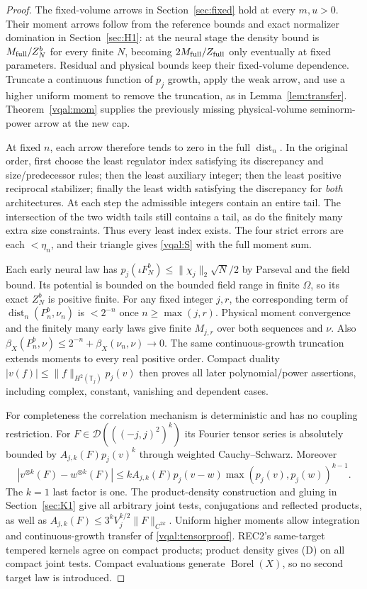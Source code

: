 \documentclass[11pt]{article}
\theoremstyle{plain}
\theoremstyle{definition}
\theoremstyle{remark}
\newcommand{\T}{\mathbb{T}}
\newcommand{\cD}{\mathcal{D}}
\begin{document}
\begin{proof}
The fixed-volume arrows in Section~\ref{sec:fixed} hold at every
$m,u>0$. Their moment arrows follow from the reference bounds and exact
normalizer domination in Section~\ref{sec:H1}: at the neural stage the
density bound is $M_{\rm full}/Z_N^b$ for every finite $N$, becoming
$2M_{\rm full}/Z_{\rm full}$ only eventually at fixed parameters.
Residual and physical bounds keep their fixed-volume dependence.
Truncate a continuous function of $p_j$ growth, apply the weak arrow,
and use a higher uniform moment to remove the truncation, as in
Lemma~\ref{lem:transfer}. Theorem~\ref{vqal:mom} supplies the previously
missing physical-volume seminorm-power arrow at the new cap.

At fixed $n$, each arrow therefore tends to zero in the full
$\operatorname{dist}_n$. In the original order, first choose the least
regulator index satisfying its discrepancy and size/predecessor rules;
then the least auxiliary integer; then the least positive reciprocal
stabilizer; finally the least width satisfying the discrepancy for
\emph{both} architectures. At each step the admissible integers contain
an entire tail. The intersection of the two width tails still contains
a tail, as do the finitely many extra size constraints. Thus every
least index exists. The four strict errors are each $<\eta_n$, and
their triangle gives \eqref{vqal:S} with the full moment sum.

Each early neural law has
$p_j(\iota F_N^b)\le\|\chi_j\|_2\sqrt N/2$ by Parseval and the
field bound. Its potential is bounded on the bounded field range in
finite $\Omega$, so its exact $Z_N^b$ is positive finite. For any fixed
integer $j,r$, the corresponding term of
$\operatorname{dist}_n(P_n^b,\nu_n)$ is $<2^{-n}$ once
$n\ge\max(j,r)$. Physical moment convergence and the finitely many
early laws give finite $M_{j,r}$ over both sequences and $\nu$.
Also $\beta_X(P_n^b,\nu)\le2^{-n}+\beta_X(\nu_n,\nu)\to0$.
The same continuous-growth truncation extends moments to every real
positive order. Compact duality $|v(f)|\le\|f\|_{H^2(\T_j)}p_j(v)$
then proves all later polynomial/power assertions, including complex,
constant, vanishing and dependent cases.

For completeness the correlation mechanism is deterministic and has no
coupling restriction. For $F\in\cD(((-j,j)^2)^k)$ its Fourier tensor
series is absolutely bounded by $A_{j,k}(F)p_j(v)^k$ through weighted
Cauchy--Schwarz. Moreover
\begin{equation}\label{vqal:tensorproof}
 |v^{\otimes k}(F)-w^{\otimes k}(F)|
 \le kA_{j,k}(F)p_j(v-w)\max(p_j(v),p_j(w))^{k-1}.
\end{equation}
The $k=1$ last factor is one. The product-density construction and
gluing in Section~\ref{sec:K1} give all arbitrary joint tests,
conjugations and reflected products, as well as
$A_{j,k}(F)\le3^kV_j^{k/2}\|F\|_{C^{2k}}$.
Uniform higher moments allow integration and continuous-growth transfer
of \eqref{vqal:tensorproof}. REC2's same-target tempered kernels agree
on compact products; product density gives (D) on all compact joint
tests. Compact evaluations generate $\operatorname{Borel}(X)$, so no
second target law is introduced.


\end{proof}
\end{document}
